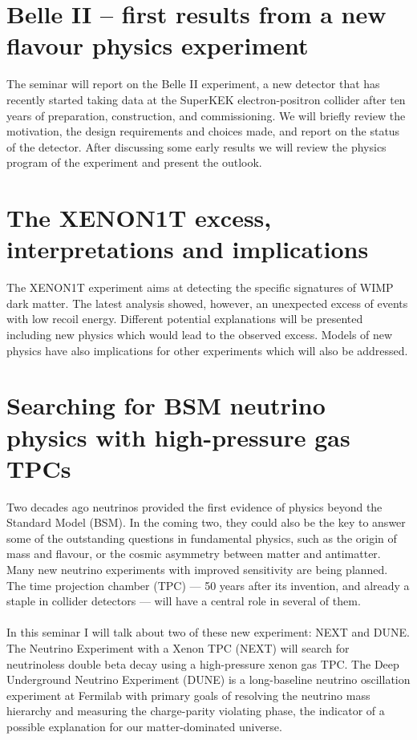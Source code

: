 \documentclass[12pt, a4paper, notitlepage, onecolumn]{article}
\begin{document}
\section{Belle II – first results from a new flavour physics experiment}
\noindent The seminar will report on the Belle II experiment, a new detector that has recently started taking data at the SuperKEK electron-positron collider after ten years of preparation, construction, and commissioning. We will briefly review the motivation, the design requirements and choices made, and report on the status of the detector. After discussing some early results we will review the physics program of the experiment and present the outlook.

\section{The XENON1T excess, interpretations and implications}
\noindent The XENON1T experiment aims at detecting the specific signatures of WIMP dark matter. The latest analysis showed, however, an unexpected excess of events with low recoil energy. Different potential explanations will be presented including new physics which would lead to the observed excess. Models of new physics have also implications for other experiments which will also be addressed.

\section{Searching for BSM neutrino physics with high-pressure gas TPCs}
\noindent Two decades ago neutrinos provided the first evidence of physics beyond the Standard Model (BSM). In the coming two, they could also be the key to answer some of the outstanding questions in fundamental physics, such as the origin of mass and flavour, or the cosmic asymmetry between matter and antimatter. Many new neutrino experiments with improved sensitivity are being planned. The time projection chamber (TPC) — 50 years after its invention, and already a staple in collider detectors — will have a central role in several of them. 
\\ \\
In this seminar I will talk about two of these new experiment: NEXT and DUNE. The Neutrino Experiment with a Xenon TPC (NEXT) will search for neutrinoless double beta decay using a high-pressure xenon gas TPC. The Deep Underground Neutrino Experiment (DUNE) is a long-baseline neutrino oscillation experiment at Fermilab with primary goals of resolving the neutrino mass hierarchy and measuring the charge-parity violating phase, the indicator of a possible explanation for our matter-dominated universe.
\end{document}
